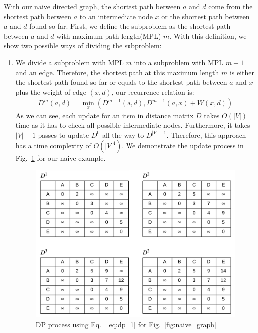 \documentclass[../main.tex]{subfiles}
\begin{document}
With our naive directed graph, the shortest path between $a$ and $d$ come from the shortest path between $a$ to an intermediate node $x$ or the shortest path between $a$ and $d$ found so far. First, we define the subproblem as the shortest path between $a$ and $d$ with maximum path length(MPL) $m$. With this definition, we show two possible ways of dividing the subproblem:
\begin{enumerate}
    \item  We divide a subproblem with MPL $m$ into a subproblem with MPL $m-1$ and an edge. Therefore, the shortest path at this maximum length $m$ is either the shortest path found so far or equals to the shortest path between $a$ and $x$ plus the weight of edge $(x,d)$, our recurrence relation is:
    \begin{align}
    D^{m}{(a,d)} = \min_x(D^{m-1}{(a,d)}, D^{m-1}{(a,x)}+W{(x,d)})
    \label{eq:dp_1}
    \end{align}
    As we can see, each update for an item in distance matrix $D$ takes $O(|V|)$ time as it has to check all possible intermediate nodes. Furthermore, it takes $|V|-1$ passes to update $D^{0}$ all the way to $D^{|V|-1}$. Therefore, this approach has a time complexity of $O(|V|^4)$. We demonstrate the update process in  Fig.~\ref{fig:dp_1} for our naive example.
    \begin{figure}[!ht]
    \centering
    \includegraphics[width=0.8\columnwidth]{fig/DP_shortest_paths (1).png}
        \caption{DP process using Eq. ~\ref{eq:dp_1} for Fig.~\ref{fig:naive_graph}}
    \label{fig:dp_1}
\end{figure}
    \begin{figure}[!ht]
    \centering

\end{figure}
\end{enumerate}
\end{document}
